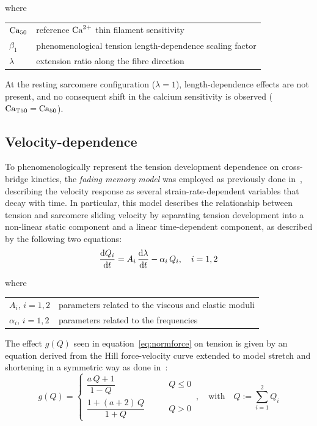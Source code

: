 \noindent
where

\vspace{0.2cm}
\begin{tabular}{ll}
    $\textrm{Ca}_{50}$   & reference $\textrm{Ca}^{2+}$ thin filament sensitivity \\
    $\beta_1$ & phenomenological tension length-dependence scaling factor \\
    $\lambda$ & extension ratio along the fibre direction
\end{tabular}

\vspace{0.2cm}\noindent
At the resting sarcomere configuration ($\lambda=1$), length-dependence effects are not present, and no consequent shift in the calcium sensitivity is observed ($\textrm{Ca}_{\textrm{T}50}=\textrm{Ca}_{50}$).


%
%
%
\subsection{Velocity-dependence}\label{sec:ch2velocitydependence}
To phenomenologically represent the tension development dependence on cross-bridge kinetics, the \emph{fading memory model} was employed as previously done in~\cite{Niederer:2006}, describing the velocity response as several strain-rate-dependent variables that decay with time. In particular, this model describes the relationship between tension and sarcomere sliding velocity by separating tension development into a non-linear static component and a linear time-dependent component, as described by the following two equations:
%
\begin{equation}
    \dfrac{\mathrm{d}{Q_i}}{\mathrm{d}{t}} = A_i\,\dfrac{\mathrm{d}{\lambda}}{\mathrm{d}{t}}-\alpha_i\,Q_i,\quad i=1,2
\end{equation}

\noindent
where

\vspace{0.2cm}
\begin{tabular}{ll}
    $A_i,\,i=1,2$      & parameters related to the viscous and elastic moduli \\
    $\alpha_i,\,i=1,2$ & parameters related to the frequencies
\end{tabular}

\vspace{0.2cm}\noindent
The effect $g(Q)$ seen in equation~\eqref{eq:normforce} on tension is given by an equation derived from the Hill force-velocity curve extended to model stretch and shortening in a symmetric way as done in~\cite{Niederer:2006}:
%
\begin{equation}
    g(Q) = \begin{cases}
        \dfrac{a\,Q+1}{1-Q}\qquad & Q\le 0 \\
        \dfrac{1+(a+2)\,Q}{1+Q}\qquad & Q>0
    \end{cases}\,,\quad\text{with}\quad Q := \sum_{i=1}^2 Q_i
\end{equation}

